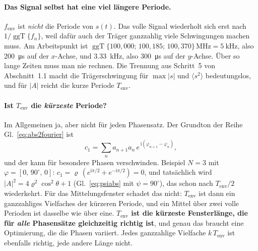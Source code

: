 \documentclass[11pt,a4paper]{article}
\begin{document}
\paragraph{Das Signal selbst hat eine viel längere Periode.}
$f_\mathrm{env}$ ist \emph{nicht} die Periode von $s(t)$. Das volle Signal
wiederholt sich erst nach $1/\operatorname{ggT}\{f_n\}$, weil dafür auch der
Träger ganzzahlig viele Schwingungen machen muss. Am Arbeitspunkt ist
$\operatorname{ggT}\{100{,}000;\,100{,}185;\,100{,}370\}\,\si{\mega\hertz}
= \SI{5}{\kilo\hertz}$, also \SI{200}{\micro\second} auf der $x$-Achse, und
\SI{3.33}{\kilo\hertz}, also \SI{300}{\micro\second} auf der $y$-Achse.
Über so lange Zeiten muss man nie rechnen. Die Trennung aus Schritt~5 von
Abschnitt~1.1 macht die Trägerschwingung für $\max|s|$ und $\langle s^2\rangle$
bedeutungslos, und für $|A|$ reicht die kurze Periode $T_\mathrm{env}$.

\paragraph{Ist \boldmath$T_\mathrm{env}$ die \emph{kürzeste} Periode?}
Im Allgemeinen ja, aber nicht für jeden Phasensatz. Der Grundton der Reihe
Gl.~\eqref{eq:abs2fourier} ist
\begin{equation}
  c_1 = \sum_n a_{n+1}a_n\,e^{\,\mathrm{i}(\varphi_{n+1}-\varphi_n)} ,
\end{equation}
und der kann für besondere Phasen verschwinden. Beispiel $N=3$ mit
$\varphi=[0,\,90^\circ,\,0]$: $c_1 = \varrho\,(e^{\mathrm{i}\pi/2}+e^{-\mathrm{i}\pi/2}) = 0$,
und tatsächlich wird $|A|^2 = 4\varrho^2\cos^2\theta+1$ (Gl.~\eqref{eq:psiabs}
mit $\psi=90^\circ$), das schon nach $T_\mathrm{env}/2$ wiederkehrt. Für
das Mittelungsfenster schadet das nicht: $T_\mathrm{env}$ ist dann ein
ganzzahliges Vielfaches der kürzeren Periode, und ein Mittel über zwei
volle Perioden ist dasselbe wie über eine. \textbf{$T_\mathrm{env}$ ist die
kürzeste Fensterlänge, die für \emph{alle} Phasensätze gleichzeitig
richtig ist}, und genau das braucht eine Optimierung, die die Phasen
variiert. Jedes ganzzahlige Vielfache $k\,T_\mathrm{env}$ ist ebenfalls
richtig, jede andere Länge nicht.
\end{document}
